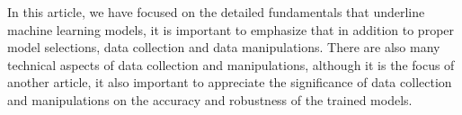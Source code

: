 
\par
In this article, we have focused on the detailed fundamentals that underline machine learning models, it is important to emphasize that in addition to proper model selections,  data collection and data manipulations. There are also many technical aspects of data collection and manipulations, although it is the focus of another article, it also important to appreciate the significance of data collection and manipulations on the accuracy and robustness of the trained models.
\par 

